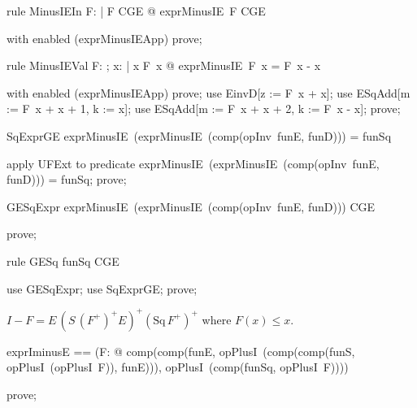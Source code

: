 \documentclass{article}
\begin{document}
\begin{theorem}{rule MinusIEIn}
  \forall F: \nat \fun \nat | F \in CGE @ exprMinusIE~F \in CGE
\end{theorem}

\begin{zproof}
with enabled (exprMinusIEApp) prove;
\end{zproof}

\begin{theorem}{rule MinusIEVal}
  \forall F: \nat \fun \nat; x: \nat | x \leq F~x @ exprMinusIE~F~x = F~x - x
\end{theorem}

\begin{zproof}
with enabled (exprMinusIEApp) prove;
use EinvD[z := F~x + x];
use ESqAdd[m := F~x + x + 1, k := x];
use ESqAdd[m := F~x + x + 2, k := F~x - x];
prove;
\end{zproof}

\begin{theorem}{SqExprGE}
  exprMinusIE~(exprMinusIE~(comp(opInv~funE, funD))) = funSq
\end{theorem}

\begin{zproof}
apply UFExt to predicate exprMinusIE~(exprMinusIE~(comp(opInv~funE, funD))) = funSq;
prove;
\end{zproof}

\begin{theorem}{GESqExpr}
  exprMinusIE~(exprMinusIE~(comp(opInv~funE, funD))) \in CGE
\end{theorem}

\begin{zproof}
prove;
\end{zproof}

\begin{theorem}{rule GESq}
  funSq \in CGE
\end{theorem}

\begin{zproof}
use GESqExpr;
use SqExprGE;
prove;
\end{zproof}


$I - F = E\,(S\,(F^+)^+ E)^+ (\mathrm{Sq}\,F^+)^+$ where $F(x) \leq x$.

\begin{zed}
  exprIminusE == (\lambda F: \nat \fun \nat @ comp(comp(funE, opPlusI~(comp(comp(funS, opPlusI~(opPlusI~F)), funE))), opPlusI~(comp(funSq, opPlusI~F))))
\end{zed}

\begin{zproof}
prove;
\end{zproof}
\end{document}

